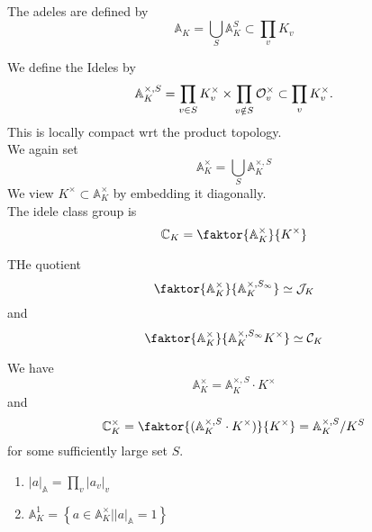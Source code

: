 \documentclass[../main.tex]{subfiles}
\begin{document}
The adeles are defined by
\[ 
\mathbb{A}_K = \bigcup_{S} \mathbb{A}_K^{S} \subset \prod_v K_v
\]
\begin{defn}[Ideles]
	We define the Ideles by
	\[ 
	\mathbb{A}_K^{\times,S}= \prod_{v \in S} K^{\times}_v \times \prod_{v \notin S} \mathcal{O}_v^{\times} \subset \prod_v K_v^{\times}.
	\]
This is locally compact wrt the product topology.\\
	We again set
	\[ 
	\mathbb{A}_K^{\times}= \bigcup_S \mathbb{A}_K^{\times,S}
	\]
We view $K^{\times}\subset \mathbb{A}_K^{\times}$ by embedding it diagonally.	\\
The idele class group is 
\[ 
\mathbb{C}_K = \faktor{\mathbb{A}_K^{\times}}{K^{\times}}
\]

\end{defn}
\begin{thm}
	THe quotient
	\[ 
	\faktor{\mathbb{A}_K^{\times}}{\mathbb{A}_K^{\times, S_{ \infty } }}\simeq \mathcal{J}_K
	\]
	and 
	\[ 
	\faktor{ \mathbb{A}_K^{\times}}{\mathbb{A}_K^{\times,S_{ \infty } } K^{\times}}\simeq \mathcal{C}_K
	\]
	
\end{thm}
\begin{thm}
	We have
	\[ 
	\mathbb{A}_K^{\times}= \mathbb{A}_K^{\times,S}\cdot K^{\times}
	\]
	and
	\[ 
	\mathbb{C}_K^{\times}= \faktor{( \mathbb{A}_K^{\times,S}\cdot K^{\times}) }{K^{\times}}= \mathbb{A}_K^{\times,S} /K^{S}
	\]
	for some sufficiently large set $S$.
\end{thm}
\begin{rmq}
\begin{enumerate}
\item $ |a|_{ \mathbb{A}} = \prod_v |a_v|_v$ 
\item $ \mathbb{A}_K^{1}= \left\{ a\in \mathbb{A}_K^{\times}| |a|_{\mathbb{A}} =1 \right\} $ 
\end{enumerate}

\end{rmq}
\end{document}
